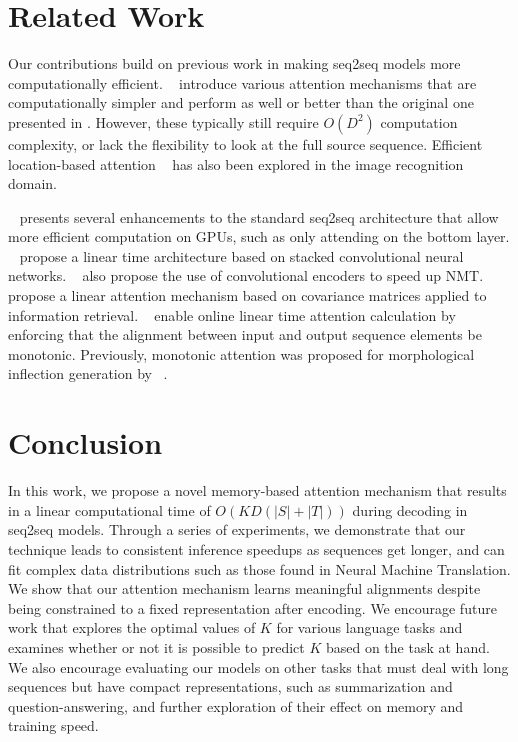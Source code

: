 \documentclass[11pt,letterpaper]{article}
\begin{document}
\section{Related Work}

Our contributions build on previous work in making seq2seq models more computationally efficient. ~\citet{Luong:2015} introduce various attention mechanisms that are computationally simpler and perform as well or better than the original one presented in \citet{Bahdanau:2014}. However, these typically still require $O(D^2)$ computation complexity, or lack the flexibility to look at the full source sequence. Efficient location-based attention ~\cite{Xu:2015} has also been explored in the image recognition domain.

~\citet{Wu:2016} presents several enhancements to the standard seq2seq architecture that allow more efficient computation on GPUs, such as only attending on the bottom layer. ~\citet{Kalchbrenner:2016} propose a linear time architecture based on stacked convolutional neural  networks. ~\citet{Gehring:2016} also propose the use of convolutional encoders to speed up NMT. ~\citet{Brebisson:2016} propose a linear attention mechanism based on covariance matrices applied to information retrieval. ~\citet{Raffel:2017} enable online linear time attention calculation by enforcing that the alignment between input and output sequence elements be monotonic. Previously, monotonic attention was proposed for morphological inflection generation by ~\citet{aharonimorphological}.


\section{Conclusion}
In this work, we propose a novel memory-based attention mechanism that results in a linear computational time of $O(KD(|S| + |T|))$ during decoding in seq2seq models. Through a series of experiments, we demonstrate that our technique leads to consistent inference speedups as sequences get longer, and can fit complex data distributions such as those found in Neural Machine Translation. We show that our attention mechanism learns meaningful alignments despite being constrained to a fixed representation after encoding. We encourage future work that explores the optimal values of $K$ for various language tasks and examines whether or not it is possible to predict $K$ based on the task at hand. We also encourage evaluating our models on other tasks that must deal with long sequences but have compact representations, such as summarization and question-answering, and further exploration of their effect on memory and training speed.


\vfill




\appendix
\end{document}
